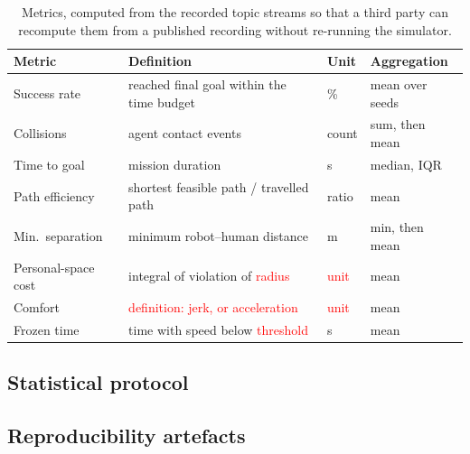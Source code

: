 \documentclass[pdflatex,sn-mathphys-num]{template/sn-jnl}%
\newcommand{\ph}[1]{\textcolor{red}{\langle #1\rangle}}
\begin{document}
\begin{table}[t]
  \centering
  \caption{Metrics, computed from the recorded topic streams so that a third
  party can recompute them from a published recording without re-running the
  simulator.}
  \label{tab:metrics}
  \begin{tabular}{llll}
    \toprule
    Metric & Definition & Unit & Aggregation \\
    \midrule
    Success rate        & reached final goal within the time budget & \%        & mean over seeds \\
    Collisions          & agent contact events                       & count     & sum, then mean \\
    Time to goal        & mission duration                           & s         & median, IQR \\
    Path efficiency     & shortest feasible path / travelled path    & ratio     & mean \\
    Min.\ separation    & minimum robot--human distance              & m         & min, then mean \\
    Personal-space cost & integral of violation of \ph{radius}       & \ph{unit} & mean \\
    Comfort             & \ph{definition: jerk, or acceleration}     & \ph{unit} & mean \\
    Frozen time         & time with speed below \ph{threshold}       & s         & mean \\
    \bottomrule
  \end{tabular}
\end{table}

\subsection{Statistical protocol}
\label{sec:method:stats}

\subsection{Reproducibility artefacts}
\label{sec:method:repro}

\end{document}
